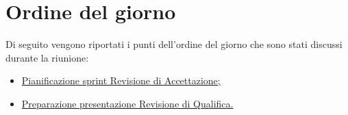 \clearpage
\section{Ordine del giorno}
Di seguito vengono riportati i punti dell’ordine del giorno che sono stati discussi durante la riunione:
\begin{itemize}
	\item \hyperref[sec:sprint]{Pianificazione sprint Revisione di Accettazione;}
	\item \hyperref[sec:presentazione]{Preparazione presentazione Revisione di Qualifica.}
\end{itemize}